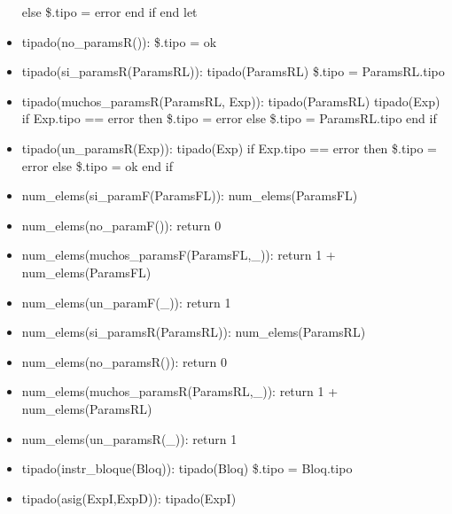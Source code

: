 \documentclass[11pt]{article}
\begin{document}
\begin{itemize}
                    \subsubitem else
                        \subsubitem \hspace{2em} \$.tipo = error
                    \subsubitem end if
                \subitem end let
            \item tipado(no\_paramsR()): 
                \subitem \$.tipo = ok
            \item tipado(si\_paramsR(ParamsRL)): 
                \subitem tipado(ParamsRL)
                \subitem \$.tipo = ParamsRL.tipo
            \item tipado(muchos\_paramsR(ParamsRL, Exp)): 
                \subitem tipado(ParamsRL)
                \subitem tipado(Exp)
                \subitem if Exp.tipo == error then
                    \subsubitem \$.tipo = error
                \subitem else
                    \subsubitem \$.tipo = ParamsRL.tipo
                \subitem end if
            \item tipado(un\_paramsR(Exp)): 
                \subitem tipado(Exp)
                \subitem if Exp.tipo == error then
                    \subsubitem \$.tipo = error
                \subitem else
                    \subsubitem \$.tipo = ok
                \subitem end if
            \item num\_elems(si\_paramF(ParamsFL)):
                \subitem num\_elems(ParamsFL)
            \item num\_elems(no\_paramF()): 
                \subitem return 0
            \item num\_elems(muchos\_paramsF(ParamsFL,\_)): 
                \subitem return 1 + num\_elems(ParamsFL)
            \item num\_elems(un\_paramF(\_)): 
                \subitem return 1
            \item num\_elems(si\_paramsR(ParamsRL)): 
                \subitem num\_elems(ParamsRL) 
            \item num\_elems(no\_paramsR()): 
                \subitem return 0
            \item num\_elems(muchos\_paramsR(ParamsRL,\_)): 
                \subitem return 1 + num\_elems(ParamsRL)
            \item num\_elems(un\_paramsR(\_)): 
                \subitem return 1
            \item tipado(instr\_bloque(Bloq)): 
                \subitem tipado(Bloq)
                \subitem \$.tipo = Bloq.tipo
            \item tipado(asig(ExpI,ExpD)): 
                \subitem tipado(ExpI) 

\end{itemize}
\end{document}
